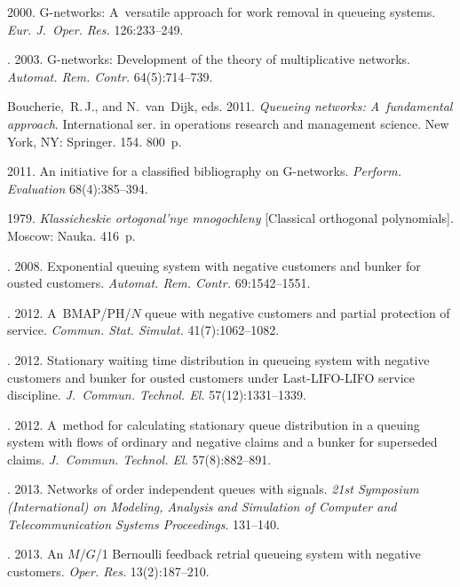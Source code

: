 \begin{multicols}{2}
{{\begin{thebibliography}{99}
 2000. G-networks: A~versatile approach for work 
removal in queueing systems. 
\textit{Eur. J.~Oper. Res.} 126:233--249.



. 2003. 
G-networks: Development of the theory of multiplicative networks.
\textit{Automat. Rem. Contr.} 64(5):714--739.

Boucherie,~R.\,J., and N.~van~Dijk, eds. 2011. \textit{Queueing networks: A~fundamental approach}. 
International ser. in operations research and management science.
New York, NY: Springer. 154. 800~p.

 2011. An initiative for a classified bibliography on G-networks.
\textit{Perform. Evaluation} 68(4):385--394.



 1979. \textit{Klassicheskie ortogonal'nye mnogochleny} 
[{Classical orthogonal polynomials}]. Moscow: Nauka. 416~p. 


. 2008. 
Exponential queuing system with negative customers and bunker for ousted customers.
\textit{Automat. Rem. Contr.} 69:1542--1551.

. 2012. A~BMAP/PH/$N$ queue 
with negative customers and partial protection of service. 
\textit{Commun. Stat. Simulat.} 41(7):1062--1082.

. 2012. Stationary waiting time
distribution in queueing system with negative customers and bunker
for ousted customers under Last-LIFO-LIFO service discipline.
\textit{J.~Commun. Technol. El.} 57(12):1331--1339.

. 2012. A~method for calculating stationary
queue distribution in a queuing system with flows of ordinary and negative
claims and a bunker for superseded claims. \textit{J.~Commun. Technol.
El.} 57(8):882--891.

. 2013. Networks of 
order independent queues with signals. \textit{21st  Symposium 
(International) on Modeling, Analysis and Simulation of Computer and 
Telecommunication Systems Proceedings}. 131--140.


. 2013. 
An $M$/$G$/1 Bernoulli feedback retrial queueing system with negative customers.
\textit{Oper. Res.} 13(2):187--210.



\end{thebibliography}}}
\end{multicols}
